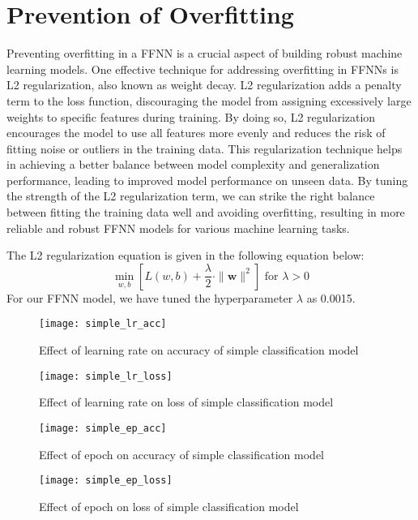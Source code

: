 \documentclass[12pt, a4paper, twoside]{article}
\begin{document}
\section{Prevention of Overfitting}
Preventing overfitting in a FFNN is a crucial aspect of building robust machine learning models. One effective technique for addressing overfitting in FFNNs is L2 regularization, also known as weight decay. L2 regularization adds a penalty term to the loss function, discouraging the model from assigning excessively large weights to specific features during training. By doing so, L2 regularization encourages the model to use all features more evenly and reduces the risk of fitting noise or outliers in the training data. This regularization technique helps in achieving a better balance between model complexity and generalization performance, leading to improved model performance on unseen data. By tuning the strength of the L2 regularization term, we can strike the right balance between fitting the training data well and avoiding overfitting, resulting in more reliable and robust FFNN models for various machine learning tasks.\cite{ang_ml, ddl_book}
\par
The L2 regularization equation is given in the following equation below:
\begin{equation}
	\min_{w, b} \left[ L(w, b) + \frac{\lambda}{2} \cdot \| \mathbf{w} \|^2 \right] \text{ for }\lambda > 0
\end{equation}
For our FFNN model, we have tuned the hyperparameter $\lambda$ as 0.0015. 
\begin{figure}[p]
	\centering
	\texttt{[image: simple\_lr\_acc]}
	\caption{Effect of learning rate on accuracy of simple classification model}
	\label{F:simple_lr_acc}
\end{figure}
\begin{figure}[p]
	\centering
	\texttt{[image: simple\_lr\_loss]}
	\caption{Effect of learning rate on loss of simple classification model}
	\label{F:simple_lr_loss}
\end{figure}
\begin{figure}[p]
	\centering
	\texttt{[image: simple\_ep\_acc]}
	\caption{Effect of epoch on accuracy of simple classification model}
	\label{F:simple_ep_acc}
\end{figure}
\begin{figure}[p]
	\centering
	\texttt{[image: simple\_ep\_loss]}
	\caption{Effect of epoch on loss of simple classification model}
	\label{F:simple_ep_loss}
\end{figure}
\end{document}
